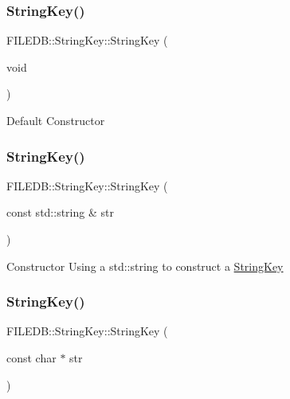 \subsubsection{\texorpdfstring{StringKey()}{StringKey()}\hspace{0.1cm}{\footnotesize\ttfamily [5/12]}}
{\footnotesize\ttfamily F\+I\+L\+E\+D\+B\+::\+String\+Key\+::\+String\+Key (\begin{DoxyParamCaption}\item[{void}]{ }\end{DoxyParamCaption})}

Default Constructor \mbox{\label{classFILEDB_1_1StringKey_a18edda7351ebadd52d18bcde2cc8a71c}} 
\subsubsection{\texorpdfstring{StringKey()}{StringKey()}\hspace{0.1cm}{\footnotesize\ttfamily [6/12]}}
{\footnotesize\ttfamily F\+I\+L\+E\+D\+B\+::\+String\+Key\+::\+String\+Key (\begin{DoxyParamCaption}\item[{const std\+::string \&}]{str }\end{DoxyParamCaption})}

Constructor Using a std\+::string to construct a \mbox{\hyperlink{classFILEDB_1_1StringKey}{String\+Key}} \mbox{\label{classFILEDB_1_1StringKey_a7710b1f6cafd04e1e178d24019e81ae5}} 
\subsubsection{\texorpdfstring{StringKey()}{StringKey()}\hspace{0.1cm}{\footnotesize\ttfamily [7/12]}}
{\footnotesize\ttfamily F\+I\+L\+E\+D\+B\+::\+String\+Key\+::\+String\+Key (\begin{DoxyParamCaption}\item[{const char $\ast$}]{str }\end{DoxyParamCaption})}

\mbox{\label{classFILEDB_1_1StringKey_a042b0231e08bfbd9f9bc3802d95d0e9c}} 
